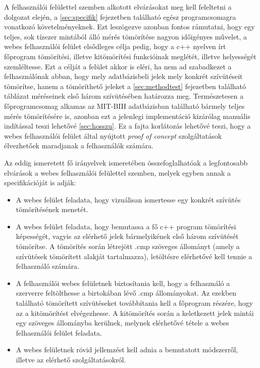 \documentclass[oneside,titlepage,12pt,a4paper]{report}
\begin{document}
A felhasználói felülettel szemben alkotott elvárásokat meg kell feleltetni a dolgozat elején, a \ref{sec:specifik} fejezetben található egész programcsomagra vonatkozó követelményeknek. Ezt leszögezve azonban fontos rámutatni, hogy egy teljes, sok tízezer mintából álló mérés tömörítése nagyon időigényes művelet, a webes felhasználói felület elsődleges célja pedig, hogy a c++ nyelven írt főprogram tömörítési, illetve kitömörítési funkcióinak meglétét, illetve helyességét szemléltesse. Ezt a célját a felület akkor is eléri, ha nem ad szabadkezet a felhasználónak abban, hogy mely adatbázisbeli jelek mely konkrét szívütéseit tömörítse, hanem a tömöríthető jeleket a \ref{sec:methodtest} fejezetben található táblázat méréseinek első három szívütésében határozza meg. Természetesen a főprogramcsomag alkamas az MIT-BIH adatbázisban található bármely teljes mérés tömörítésére is, azonban ezt a jelenlegi implementáció kizárólag manuális indítással teszi lehetővé \ref{sec:hosszu}. Ez a fajta korlátozás lehetővé teszi, hogy a webes felhasználói felület által nyújtott \textit{proof of concept} szolgáltatások élvezhetőek maradjanak a felhasználók számára. 
\par Az eddig ismeretett fő irányelvek ismeretében összefoglalhatóak a legfontosabb elvárások a webes felhasználói felülettel szemben, melyek egyben annak a specifikációját is adják:
\begin{itemize}
  \item A webes felület feladata, hogy vizuálisan ismertesse egy konkrét szívütés tömörítésének menetét.
  \item A webes felület feladata, hogy bemutassa a fő c++ program tömörítési képességét, vagyis az elérhető jelek bármelyikének első három szívütését tömörítse. A tömörítés során létrejött .cmp szöveges állományt (amely a szívütések tömörített alakját tartalmazza), letöltésre elérhetővé kell tennie a felhasználó számára. 
  \item A felhasználói webes felületnek biztosítania kell, hogy a felhasználó a szerverre feltölthesse a birtokában lévő .cmp állományokat. Az ezekben található tömörített szívütéseket továbbítania kell a főprogram részére, hogy az a kitömörítést elvégezhesse. A kitömörítés során a keletkezett jelek mintái egy szöveges állományba kerülnek, melynek elérhetővé tétele a webes felhasználói felület feladata.
  \item A webes felületnek rövid jellemzést kell adnia a bemutatott módszerről, illetve az elérhető szolgáltatásokról. 
\end{itemize}
   
\end{document}
